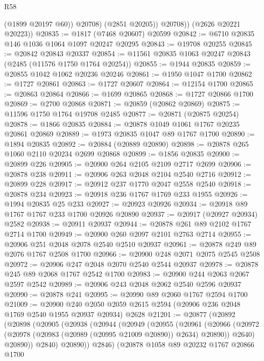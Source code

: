 \begin{lexlean}{R58}
\begin{coremodule}
                (@1899 @20197 @60))
              @20708)
            (@2851 @20205))
          @20708))
      (@2626 @20221 @20223))
@20835 := @1817 (@7468 @20607) @20599
@20842 := @6710 @20835 @146 @1036 @1064 @1097 @20247 @20295
@20843 := @19708 @20255
@20845 := @20842 @20843 @20337
@20854 := @11561 @20835 @1063 @20247 @20843 (@2485 (@11576 @1750 @1764 @20254))
@20855 := @1944 @20835
@20859 := @20855 @1042 @1062 @20236 @20246
@20861 := @1950 @1047 @1700
@20862 := @1727 @20861
@20863 := @1727 @20607
@20864 := @12154 @1700
@20865 := @20863 @20864
@20866 := @1699 @20865
@20868 := @1727 @20866 @1700
@20869 := @2700 @20868
@20871 := @20859 (@20862 @20869)
@20875 := @11596 @1750 @1764 @19708 @2485
@20877 := @20871 (@20875 @20254)
@20878 := @1866 @20835
@20884 := @20878 @1049 @1061 @1767 @20235 @20861 @20869
@20889 := @1973 @20835 @1047 @89 @1767 @1700
@20890 := @1894 @20835
@20892 := @20884 (@20889 @20890)
@20898 := @20878 @265 @1060 @2110 @20234 @2699 @20868
@20899 := @1856 @20835
@20900 := @20899 @226
@20905 := @20900 @264 @2105 @2109 @2717 @2699
@20906 := @20878 @238
@20911 := @20906 @263 @2048 @2104 @2540 @2716
@20912 := @20899 @228
@20917 := @20912 @237 @1770 @2047 @2558 @2540
@20918 := @20878 @234
@20923 := @20918 @236 @1767 @1769 @233 @1955
@20926 := @1994 @20835 @25 @233
@20927 := @20923 @20926
@20934 := @20918 @89 @1767 @1767 @233 @1700 @20926 @20890
@20937 := @20917 (@20927 @20934) @2582
@20938 := @20911 @20937
@20944 := @20878 @261 @89 @2102 @1767 @2714 @1700
@20949 := @20900 @260 @2097 @2101 @2763 @2714
@20955 := @20906 @251 @2048 @2078 @2540 @2510 @20937
@20961 := @20878 @249 @89 @2076 @1767 @2508 @1700
@20966 := @20900 @248 @2071 @2075 @2545 @2508
@20972 := @20906 @247 @2048 @2070 @2540 @2544 @20937
@20978 := @20878 @245 @89 @2068 @1767 @2542 @1700
@20983 := @20900 @244 @2063 @2067 @2597 @2542
@20989 := @20906 @243 @2048 @2062 @2540 @2596 @20937
@20990 := @20878 @241
@20995 := @20990 @89 @2060 @1767 @2594 @1700
@21009 := @20900
    @240
    @2050
    @2059
    @2615
    @2594
    (@20906 @236 @2048 @1769 @2540 @1955 @20937 @20934)
    @2628
@21201 := @20877
    (@20892
      (@20898
        (@20905
          (@20938
            (@20944
              (@20949
                (@20955
                  (@20961
                    (@20966
                      (@20972 (@20978 (@20983 (@20989 (@20995 @21009 @20890)) @2634) @20890))
                      @2640)
                    @20890))
                @2840)
              @20890))
          @2846)
        (@20878
          @1058
          @89
          @20232
          @1767
          @20866
          @1700

\end{coremodule}
\end{lexlean}

